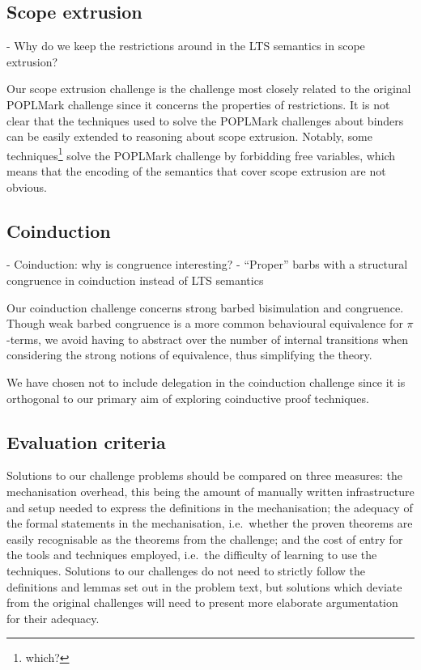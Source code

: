 \documentclass[runningheads]{llncs}
\begin{document}
\subsection{Scope extrusion}
- Why do we keep the restrictions around in the LTS semantics in scope extrusion?

Our scope extrusion challenge is the challenge most closely related to the original POPLMark challenge since it concerns the properties of restrictions.
It is not clear that the techniques used to solve the POPLMark challenges about binders can be easily extended to reasoning about scope extrusion.
Notably, some techniques\footnote{which?} solve the POPLMark challenge by forbidding free variables, which means that the encoding of the semantics that cover scope extrusion are not obvious.

\subsection{Coinduction}
- Coinduction: why is congruence interesting?
- ``Proper'' barbs with a structural congruence in coinduction instead of LTS semantics

Our coinduction challenge concerns strong barbed bisimulation and congruence.
Though weak barbed congruence is a more common behavioural equivalence for \(\pi\)-terms, we avoid having to abstract over the number of internal transitions when considering the strong notions of equivalence, thus simplifying the theory.

We have chosen not to include delegation in the coinduction challenge since it is orthogonal to our primary aim of exploring coinductive proof techniques.

\subsection{Evaluation criteria}
Solutions to our challenge problems should be compared on three measures: the mechanisation overhead, this being the amount of manually written infrastructure and setup needed to express the definitions in the mechanisation; the adequacy of the formal statements in the mechanisation, i.e.\ whether the proven theorems are easily recognisable as the theorems from the challenge; and the cost of entry for the tools and techniques employed, i.e.\ the difficulty of learning to use the techniques.
Solutions to our challenges do not need to strictly follow the definitions and lemmas set out in the problem text, but solutions which deviate from the original challenges will need to present more elaborate argumentation for their adequacy.
\end{document}
